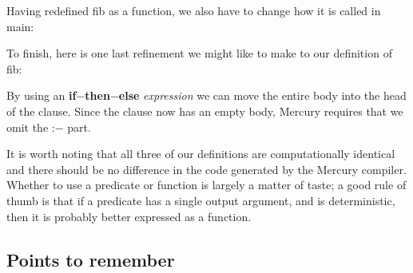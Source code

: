 \documentclass[a4paper,11pt,notitlepage,onecolumn]{book}
\begin{document}
Having redefined \textsf{fib} as a function, we also have to change how it is
called in \textsf{main}:
\begin{small}

\begin{ptabular}
\nextline
{}
\nextline
{}
\nextline
{}
\nextline
\end{ptabular}

\end{small}

To finish, here is one last refinement we might like to make to our
definition of \textsf{fib}:
\begin{small}

\begin{ptabular}
\nextline
\end{ptabular}

\end{small}
By using an \textsf{\textbf{if}{\ensuremath{-}}\textbf{then}{\ensuremath{-}}\textbf{else}} \emph{expression} we can move the entire body
into the head of the clause.  Since the clause now has an empty body,
Mercury requires that we omit the \textsf{:{\ensuremath{-}}} part.

It is worth noting that all three of our definitions are computationally
identical and there should be no difference in the code generated by the
Mercury compiler.  Whether to use a predicate or function is largely a
matter of taste; a good rule of thumb is that if a predicate has a single
output argument, and is deterministic, then it is probably better expressed
as a function.

\subsection*{Points to remember}
\end{document}
